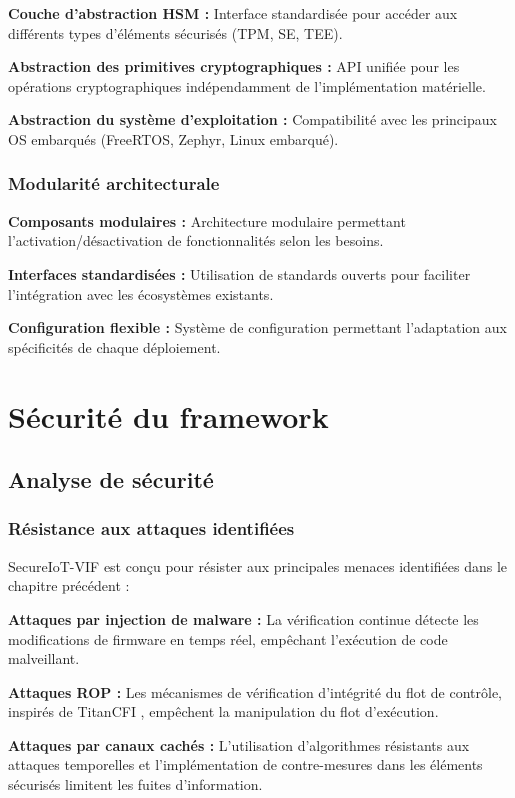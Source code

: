 \textbf{Couche d'abstraction HSM :} Interface standardisée pour accéder aux différents types d'éléments sécurisés (TPM, SE, TEE).

\textbf{Abstraction des primitives cryptographiques :} API unifiée pour les opérations cryptographiques indépendamment de l'implémentation matérielle.

\textbf{Abstraction du système d'exploitation :} Compatibilité avec les principaux OS embarqués (FreeRTOS, Zephyr, Linux embarqué).

\subsubsection{Modularité architecturale}

\textbf{Composants modulaires :} Architecture modulaire permettant l'activation/désactivation de fonctionnalités selon les besoins.

\textbf{Interfaces standardisées :} Utilisation de standards ouverts pour faciliter l'intégration avec les écosystèmes existants.

\textbf{Configuration flexible :} Système de configuration permettant l'adaptation aux spécificités de chaque déploiement.

\section{Sécurité du framework}

\subsection{Analyse de sécurité}

\subsubsection{Résistance aux attaques identifiées}

SecureIoT-VIF est conçu pour résister aux principales menaces identifiées dans le chapitre précédent :

\textbf{Attaques par injection de malware :} La vérification continue détecte les modifications de firmware en temps réel, empêchant l'exécution de code malveillant.

\textbf{Attaques ROP :} Les mécanismes de vérification d'intégrité du flot de contrôle, inspirés de TitanCFI \cite{Parisi2024TitanCFI}, empêchent la manipulation du flot d'exécution.

\textbf{Attaques par canaux cachés :} L'utilisation d'algorithmes résistants aux attaques temporelles et l'implémentation de contre-mesures dans les éléments sécurisés limitent les fuites d'information.

